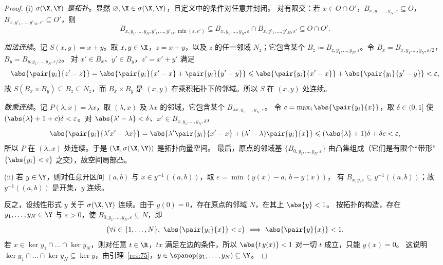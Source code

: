 \begin{proof}
(i) \emph{$\sigma(\X,\Y)$ 是拓扑}。显然 $\varnothing,\X\in\sigma(\X,\Y)$，且定义中的条件对任意并封闭。
对有限交：若 $x\in O\cap O'$，$B_{x,y_1,\dots,y_N,\varepsilon}\subseteq O$，$B_{x,y'_1,\dots,y'_M,\varepsilon'}\subseteq O'$，则
\[
  B_{x,y_1,\dots,y_N,y'_1,\dots,y'_M,\min(\varepsilon,\varepsilon')}\subseteq B_{x,y_1,\dots,y_N,\varepsilon}\cap B_{x,y'_1,\dots,y'_M,\varepsilon'}\subseteq O\cap O'.
\]

\emph{加法连续}。记 $S(x,y)=x+y$。取 $x,y\in\X$，$z=x+y$，以及 $z$ 的任一邻域 $N_z$；它包含某个
$B_z\coloneqq B_{z,y_1,\dots,y_N,\varepsilon}$。令 $B_x=B_{x,y_1,\dots,y_N,\varepsilon/2}$，$B_y=B_{y,y_1,\dots,y_N,\varepsilon/2}$。
对 $x'\in B_x$、$y'\in B_y$，$z'=x'+y'$ 满足
\[
  \abs{\pair{y_i}{z'-z}}=\abs{\pair{y_i}{x'-x}+\pair{y_i}{y'-y}}\leqslant\abs{\pair{y_i}{x'-x}}+\abs{\pair{y_i}{y'-y}}<\varepsilon,
\]
故 $S(B_x\times B_y)\subseteq B_z\subseteq N_z$，而 $B_x\times B_y$ 是 $(x,y)$ 在乘积拓扑下的邻域。所以 $S$ 在 $(x,y)$ 处连续。

\emph{数乘连续}。记 $P(\lambda,x)=\lambda x$，取 $(\lambda,x)$ 及 $\lambda x$ 的邻域，它包含某个 $B_{\lambda x,y_1,\dots,y_N,\varepsilon}$。
令 $c=\max_i\abs{\pair{y_i}{x}}$，取 $\delta\in(0,1]$ 使 $(\abs{\lambda}+1+c)\delta<\varepsilon$。对 $\abs{\lambda'-\lambda}<\delta$、$x'\in B_{x,y_1,\dots,y_N,\delta}$，
\[
  \abs{\pair{y_i}{\lambda'x'-\lambda x}}
  =\abs{\lambda'\pair{y_i}{x'-x}+(\lambda'-\lambda)\pair{y_i}{x}}
  \leqslant(\abs{\lambda}+1)\delta+\delta c<\varepsilon,
\]
所以 $P$ 在 $(\lambda,x)$ 处连续。于是 $(\X,\sigma(\X,\Y))$ 是拓扑向量空间。
最后，原点的邻域基 $\{B_{0,y_1,\dots,y_N,\varepsilon}\}$ 由凸集组成（它们是有限个“带形”$\{\abs{y_i}<\varepsilon\}$ 之交），故空间局部凸。

(ii) 若 $y\in\Y$，则对任意开区间 $(a,b)$ 与 $x\in y^{-1}((a,b))$，取 $\varepsilon=\min(y(x)-a,\,b-y(x))$，
有 $B_{x,y,\varepsilon}\subseteq y^{-1}((a,b))$；故 $y^{-1}((a,b))$ 是开集，$y$ 连续。

反之，设线性形式 $y$ 关于 $\sigma(\X,\Y)$ 连续。由于 $y(0)=0$，存在原点的邻域 $N$，在其上 $\abs{y}<1$。
按拓扑的构造，存在 $y_1,\dots,y_N\in\Y$ 与 $\varepsilon>0$，使 $B_{0,y_1,\dots,y_N,\varepsilon}\subseteq N$，即
\[
  \bigl(\forall i\in\{1,\dots,N\},\ \abs{\pair{y_i}{x}}<\varepsilon\bigr)\ \Longrightarrow\ \abs{\pair{y}{x}}<1 .
\]
若 $x\in\ker y_1\cap\dots\cap\ker y_N$，则对任意 $t\in\R$，$tx$ 满足左边的条件，所以 $\abs{t\,y(x)}<1$ 对一切 $t$ 成立，只能 $y(x)=0$。
这说明 $\ker y_1\cap\dots\cap\ker y_N\subseteq\ker y$，由引理~\ref{res:75}，$y\in\spanop(y_1,\dots,y_N)\subseteq\Y$。
\end{proof}

